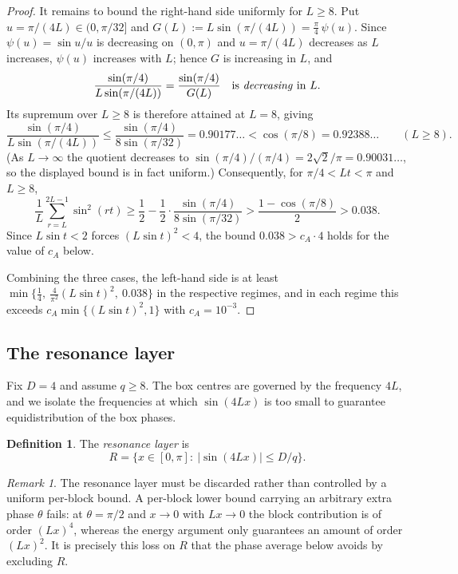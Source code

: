 \documentclass[11pt,reqno]{amsart}
\theoremstyle{plain}
\theoremstyle{definition}
\newtheorem{definition}{Definition}
\theoremstyle{remark}
\newtheorem{remark}{Remark}
\begin{document}
\begin{proof}
It remains to bound the right-hand side uniformly for $L\ge 8$. Put $u=\pi/(4L)\in(0,\pi/32]$ and $G(L):=L\sin(\pi/(4L))=\tfrac{\pi}{4}\,\psi(u)$. Since $\psi(u)=\sin u/u$ is decreasing on $(0,\pi)$ and $u=\pi/(4L)$ decreases as $L$ increases, $\psi(u)$ increases with $L$; hence $G$ is increasing in $L$, and
\[
\frac{\sin(\pi/4)}{L\sin(\pi/(4L))}=\frac{\sin(\pi/4)}{G(L)}
\quad\text{is \emph{decreasing} in }L .
\]
Its supremum over $L\ge 8$ is therefore attained at $L=8$, giving
\[
\frac{\sin(\pi/4)}{L\sin(\pi/(4L))}\le\frac{\sin(\pi/4)}{8\sin(\pi/32)}=0.90177\ldots<\cos(\pi/8)=0.92388\ldots \qquad(L\ge 8).
\]
(As $L\to\infty$ the quotient decreases to $\sin(\pi/4)/(\pi/4)=2\sqrt2/\pi=0.90031\ldots$, so the displayed bound is in fact uniform.) Consequently, for $\pi/4<Lt<\pi$ and $L\ge 8$,
\[
\frac{1}{L}\sum_{r=L}^{2L-1}\sin^2(rt)\ge\frac12-\frac12\cdot\frac{\sin(\pi/4)}{8\sin(\pi/32)}>\frac{1-\cos(\pi/8)}{2}>0.038.
\]
Since $L\sin t<2$ forces $(L\sin t)^2<4$, the bound $0.038>c_A\cdot 4$ holds for the value of $c_A$ below.

Combining the three cases, the left-hand side is at least $\min\{\tfrac14,\ \tfrac{4}{\pi^2}(L\sin t)^2,\ 0.038\}$ in the respective regimes, and in each regime this exceeds $c_A\min\{(L\sin t)^2,1\}$ with $c_A=10^{-3}$.
\end{proof}

\subsection{The resonance layer}

Fix $D=4$ and assume $q\ge 8$. The box centres are governed by the frequency $4L$, and we isolate the frequencies at which $\sin(4Lx)$ is too small to guarantee equidistribution of the box phases.

\begin{definition}
The \emph{resonance layer} is
\[
R=\{x\in[0,\pi]:\ |\sin(4Lx)|\le D/q\}.
\]
\end{definition}

\begin{remark}
The resonance layer must be discarded rather than controlled by a uniform per-block bound. A per-block lower bound carrying an arbitrary extra phase $\theta$ fails: at $\theta=\pi/2$ and $x\to 0$ with $Lx\to 0$ the block contribution is of order $(Lx)^4$, whereas the energy argument only guarantees an amount of order $(Lx)^2$. It is precisely this loss on $R$ that the phase average below avoids by excluding $R$.
\end{remark}
\end{document}
